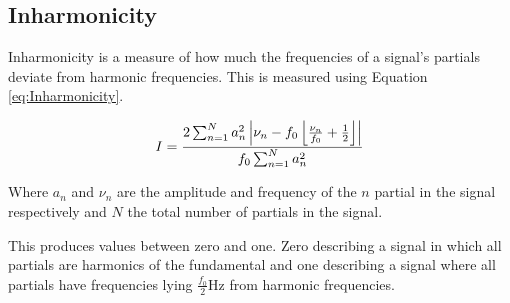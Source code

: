 	\subsection{Inharmonicity}
	\label{sec:FeatureControl-Parameterisation-Inharmonicity}
		Inharmonicity is a measure of how much the frequencies of a signal's partials deviate from harmonic
		frequencies. This is measured using Equation \ref{eq:Inharmonicity}.
		
		\begin{equation}
			I = \frac{2\sum_{n = 1}^{N}a_{n}^{2}
			           \left|\nu_{n} - f_{0}\left\lfloor\frac{\nu_{n}}{f_{0}} + \frac{1}{2}\right\rfloor\right|}
				   {f_{0}\sum_{n = 1}^{N} a_{n}^{2}}
			\label{eq:Inharmonicity}
		\end{equation}

		Where $a_{n}$ and $\nu_{n}$ are the amplitude and frequency of the $n$ partial in the signal
		respectively and $N$ the total number of partials in the signal.

		This produces values between zero and one. Zero describing a signal in which all partials are harmonics of
		the fundamental and one describing a signal where all partials have frequencies lying
		$\frac{f_{0}}{2}$Hz from harmonic frequencies.

%
%
%
%

